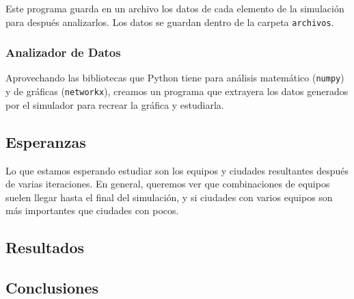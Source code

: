 {{        Este programa guarda en un archivo los datos de cada elemento de la
        simulación para después analizarlos. Los datos se guardan dentro de la
        carpeta \texttt{archivos}.
    }
    \subsubsection*{Analizador de Datos}{
        Aprovechando las bibliotecas que Python tiene para análisis matemático
        (\texttt{numpy}) y de gráficas (\texttt{networkx}), creamos un programa
        que extrayera los datos generados por el simulador para recrear la
        gráfica y estudiarla.
    }
}
\subsection*{Esperanzas}{Lo que estamos esperando estudiar son los equipos
        y ciudades resultantes después de varias iteraciones. En general, queremos ver
        que combinaciones de equipos suelen llegar hasta el final del simulación, y si
        ciudades con varios equipos son más importantes que ciudades con pocos.}

\subsection*{Resultados}{}
\subsection*{Conclusiones}{}




